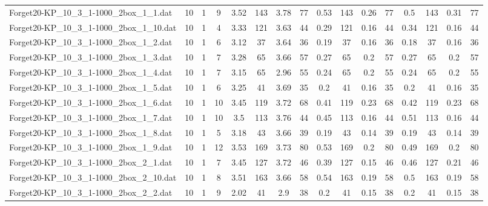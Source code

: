 \begin{sidewaystable}[!ht]
{\begin{tabular}{lccccccccccccccc}
Forget20-KP\_10\_3\_1-1000\_2box\_1\_1.dat & 10 & 1 & 9 & 3.52 & 143 & 3.78 & 77 & 0.53 & 143 &  \textcolor{blue2}{0.26} & 77 & 0.5 & 143 & 0.31 & 77 \\
Forget20-KP\_10\_3\_1-1000\_2box\_1\_10.dat & 10 & 1 & 4 & 3.33 & 121 & 3.63 & 44 & 0.29 & 121 &  \textcolor{blue2}{0.16} & 44 & 0.34 & 121 &  \textcolor{blue2}{0.16} & 44 \\
Forget20-KP\_10\_3\_1-1000\_2box\_1\_2.dat & 10 & 1 & 6 & 3.12 & 37 & 3.64 & 36 & 0.19 & 37 &  \textcolor{blue2}{0.16} & 36 & 0.18 & 37 &  \textcolor{blue2}{0.16} & 36 \\
Forget20-KP\_10\_3\_1-1000\_2box\_1\_3.dat & 10 & 1 & 7 & 3.28 & 65 & 3.66 & 57 & 0.27 & 65 &  \textcolor{blue2}{0.2} & 57 & 0.27 & 65 &  \textcolor{blue2}{0.2} & 57 \\
Forget20-KP\_10\_3\_1-1000\_2box\_1\_4.dat & 10 & 1 & 7 & 3.15 & 65 & 2.96 & 55 & 0.24 & 65 &  \textcolor{blue2}{0.2} & 55 & 0.24 & 65 &  \textcolor{blue2}{0.2} & 55 \\
Forget20-KP\_10\_3\_1-1000\_2box\_1\_5.dat & 10 & 1 & 6 & 3.25 & 41 & 3.69 & 35 & 0.2 & 41 & 0.16 & 35 & 0.2 & 41 & 0.16 & 35 \\
Forget20-KP\_10\_3\_1-1000\_2box\_1\_6.dat & 10 & 1 & 10 & 3.45 & 119 & 3.72 & 68 & 0.41 & 119 &  \textcolor{blue2}{0.23} & 68 & 0.42 & 119 &  \textcolor{blue2}{0.23} & 68 \\
Forget20-KP\_10\_3\_1-1000\_2box\_1\_7.dat & 10 & 1 & 10 & 3.5 & 113 & 3.76 & 44 & 0.45 & 113 &  \textcolor{blue2}{0.16} & 44 & 0.51 & 113 &  \textcolor{blue2}{0.16} & 44 \\
Forget20-KP\_10\_3\_1-1000\_2box\_1\_8.dat & 10 & 1 & 5 & 3.18 & 43 & 3.66 & 39 & 0.19 & 43 &  \textcolor{blue2}{0.14} & 39 & 0.19 & 43 &  \textcolor{blue2}{0.14} & 39 \\
Forget20-KP\_10\_3\_1-1000\_2box\_1\_9.dat & 10 & 1 & 12 & 3.53 & 169 & 3.73 & 80 & 0.53 & 169 &  \textcolor{blue2}{0.2} & 80 & 0.49 & 169 &  \textcolor{blue2}{0.2} & 80 \\
Forget20-KP\_10\_3\_1-1000\_2box\_2\_1.dat & 10 & 1 & 7 & 3.45 & 127 & 3.72 & 46 & 0.39 & 127 &  \textcolor{blue2}{0.15} & 46 & 0.46 & 127 & 0.21 & 46 \\
Forget20-KP\_10\_3\_1-1000\_2box\_2\_10.dat & 10 & 1 & 8 & 3.51 & 163 & 3.66 & 58 & 0.54 & 163 &  \textcolor{blue2}{0.19} & 58 & 0.5 & 163 &  \textcolor{blue2}{0.19} & 58 \\
Forget20-KP\_10\_3\_1-1000\_2box\_2\_2.dat & 10 & 1 & 9 & 2.02 & 41 & 2.9 & 38 & 0.2 & 41 &  \textcolor{blue2}{0.15} & 38 & 0.2 & 41 &  \textcolor{blue2}{0.15} & 38 \\

\end{tabular}}
\end{sidewaystable}
